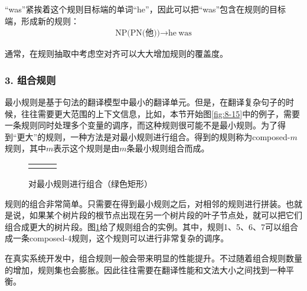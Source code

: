 \parinterval “was”紧挨着这个规则目标端的单词“he”，因此可以把“was”包含在规则的目标端，形成新的规则：
\begin{eqnarray}
\textrm{NP(PN(他))} \rightarrow \textrm{he}\ \textrm{was} \nonumber
\end{eqnarray}

\parinterval 通常，在规则抽取中考虑空对齐可以大大增加规则的覆盖度。


\subsubsection{3. 组合规则}

\parinterval 最小规则是基于句法的翻译模型中最小的翻译单元。但是，在翻译复杂句子的时候，往往需要更大范围的上下文信息，比如，本节开始图\ref{fig:8-15}中的例子，需要一条规则同时处理多个变量的调序，而这种规则很可能不是最小规则。为了得到“更大”的规则，一种方法是对最小规则进行组合。得到的规则称为composed-$m$规则，其中$m$表示这个规则是由$m$条最小规则组合而成。

\begin{figure}[htp]
\centering
\begin{tabular}{l l l}
& \subfigure{} &  \subfigure{}
\end{tabular}
\caption{对最小规则进行组合（绿色矩形）}
\label{fig:8-29}
\end{figure}

\parinterval 规则的组合非常简单。只需要在得到最小规则之后，对相邻的规则进行拼装。也就是说，如果某个树片段的根节点出现在另一个树片段的叶子节点处，就可以把它们组合成更大的树片段。图\ref{fig:8-29}给了规则组合的实例。其中，规则1、5、6、7可以组合成一条composed-4规则，这个规则可以进行非常复杂的调序。

\parinterval 在真实系统开发中，组合规则一般会带来明显的性能提升。不过随着组合规则数量的增加，规则集也会膨胀。因此往往需要在翻译性能和文法大小之间找到一种平衡。


